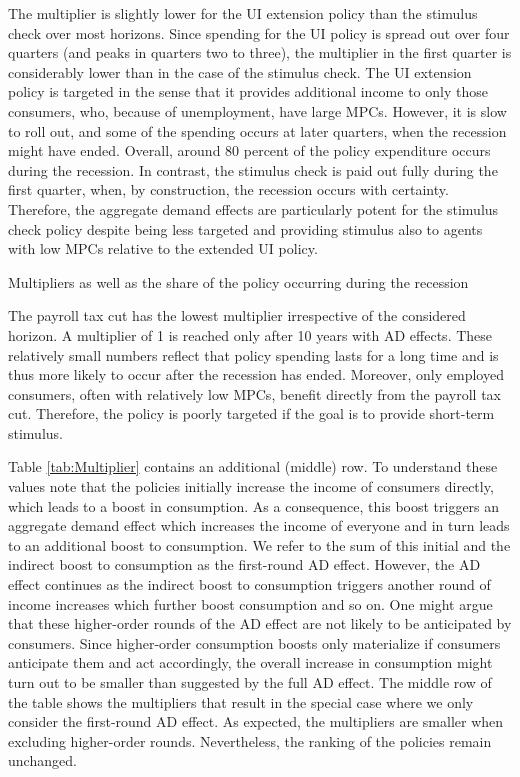 \documentclass[\econtexRoot/HAFiscal]{subfiles}
\begin{document}
The multiplier is slightly lower for the UI extension policy than the stimulus check over most horizons. Since spending for the UI policy is spread out over four quarters (and peaks in quarters two to three), the multiplier in the first quarter is considerably lower than in the case of the stimulus check. The UI extension policy is targeted in the sense that it provides additional income to only those consumers, who, because of unemployment, have large MPCs. However, it is slow to roll out, and some of the spending occurs at later quarters, when the recession might have ended. Overall, around 80 percent of the policy expenditure occurs during the recession. In contrast, the stimulus check is paid out fully during the first quarter, when, by construction, the recession occurs with certainty. Therefore, the aggregate demand effects are particularly potent for the stimulus check policy despite being less targeted and providing stimulus also to agents with low MPCs relative to the extended UI policy.

\begin{table}[t]
  \center
  
  \caption{Multipliers as well as the share of the policy occurring during the recession}
  \notinsubfile{\label{tab:Multiplier}}
\end{table}

The payroll tax cut has the lowest multiplier irrespective of the considered horizon. A multiplier of 1 is reached only after 10 years with AD effects. These relatively small numbers reflect that policy spending lasts for a long time and is thus more likely to occur after the recession has ended. Moreover, only employed consumers, often with relatively low MPCs, benefit directly from the payroll tax cut. Therefore, the policy is poorly targeted if the goal is to provide short-term stimulus.

Table \ref{tab:Multiplier} contains an additional (middle) row. To understand these values note that the policies initially increase the income of consumers directly, which leads to a boost in consumption. As a consequence, this boost triggers an aggregate demand effect which increases the income of everyone and in turn leads to an additional boost to consumption. We refer to the sum of this initial and the indirect boost to consumption as the first-round AD effect. However, the AD effect continues as the indirect boost to consumption triggers another round of income increases which further boost consumption and so on. One might argue that these higher-order rounds of the AD effect are not likely to be anticipated by consumers. Since higher-order consumption boosts only materialize if consumers anticipate them and act accordingly, the overall increase in consumption might turn out to be smaller than suggested by the full AD effect. The middle row of the table shows the multipliers that result in the special case where we only consider the first-round AD effect. As expected, the multipliers are smaller when excluding higher-order rounds. Nevertheless, the ranking of the policies remain unchanged.
\end{document}
